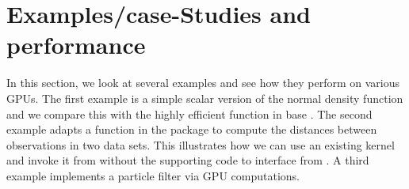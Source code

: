 \section{Examples/case-Studies and performance}\label{sec:}
% 
In this section, we look at several examples and see how they perform
on various GPUs.  The first example is a simple scalar version of the
normal density function and we compare this with the highly efficient
 function in base \R.  The second example adapts a
function in the  package to compute the distances
between observations in two data sets.  This illustrates how we can
use an existing kernel and invoke it from \R{} without the supporting
\C{} code to interface from \R.  A third example implements a particle
filter via GPU computations.
